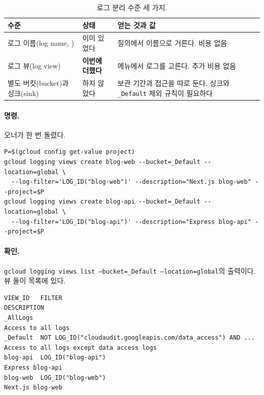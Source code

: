 \begin{table}[H]
  \caption{로그 분리 수준 세 가지.}\label{tab:06-sep-levels}
  \small
  \begin{tabularx}{\linewidth}{L{3.6cm} L{2.6cm} Y}
    \toprule
    수준 & 상태 & 얻는 것과 값 \\
    \midrule
    로그 이름(log name, ) & 이미 있었다 & 질의에서 이름으로 거른다. 비용 없음 \\
    \midrule
    로그 뷰(log view) & \textbf{이번에 더했다} & 메뉴에서 로그를 고른다. 추가 비용 없음 \\
    \midrule
    별도 버킷(bucket)과 싱크(sink) & 하지 않았다 & 보관 기간과 접근을 따로 둔다. 싱크와 \texttt{\_Default} 제외 규칙이 필요하다 \\
    \bottomrule
  \end{tabularx}
\end{table}

\paragraph{명령.}
오너가 한 번 돌렸다.

\begin{lstlisting}[language={}]
P=$(gcloud config get-value project)
gcloud logging views create blog-web --bucket=_Default --location=global \
  --log-filter='LOG_ID("blog-web")' --description="Next.js blog-web" --project=$P
gcloud logging views create blog-api --bucket=_Default --location=global \
  --log-filter='LOG_ID("blog-api")' --description="Express blog-api" --project=$P
\end{lstlisting}

\paragraph{확인.}
\texttt{gcloud logging views list --bucket=\_Default --location=global}의 출력이다.
뷰 둘이 목록에 있다.

\begin{lstlisting}[language={}]
VIEW_ID   FILTER                                                          DESCRIPTION
_AllLogs                                                                  Access to all logs
_Default  NOT LOG_ID("cloudaudit.googleapis.com/data_access") AND ...     Access to all logs except data access logs
blog-api  LOG_ID("blog-api")                                              Express blog-api
blog-web  LOG_ID("blog-web")                                              Next.js blog-web
\end{lstlisting}


